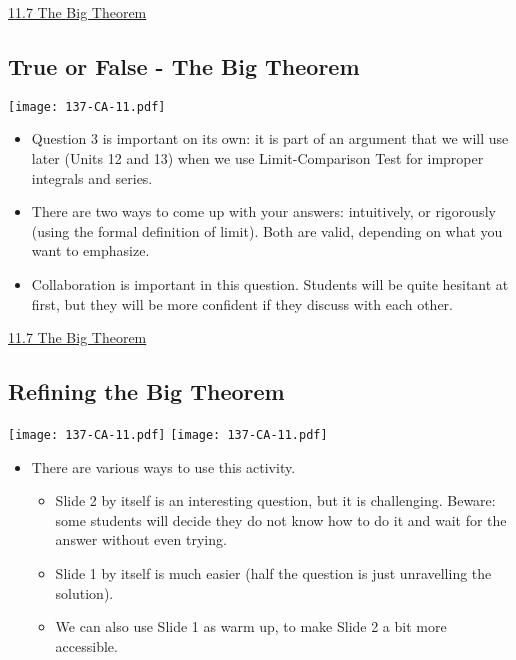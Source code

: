 \documentclass[11pt]{article}
\newcommand{\nl}{\hfill \vspace{-1.1\baselineskip}} %
\newcommand{\vvii}{\hspace{8mm} \href{https://www.youtube.com/watch?v=Dd3n2rfqxf4&list=PLlwePzQY_wW_yFyXauToZNFNhhufzioP2&index=7}{11.7 The Big Theorem}}
\begin{document}
\begin{videos}
\vvii
\end{videos}

\newpage
\subsection{True or False - The Big Theorem}

\begin{center}
{ \texttt{[image: 137-CA-11.pdf]}} 
\end{center}

\begin{comments}
\nl
	\begin{itemize}
		\item Question 3 is important on its own: it is part of an argument that we will use later (Units 12 and 13) when we use Limit-Comparison Test for improper integrals and series.
		\item  There are two ways to come up with your answers: intuitively, or rigorously (using the formal definition of limit).  Both are valid, depending on what you want to emphasize.
		\item Collaboration is important in this question.  Students will be quite hesitant at first, but they will be more confident if they discuss with each other.
	\end{itemize}
\end{comments}

\begin{videos}
\vvii
\end{videos}

\newpage
\subsection{Refining the Big Theorem}

\begin{center}
{ \texttt{[image: 137-CA-11.pdf]}} \quad
{ \texttt{[image: 137-CA-11.pdf]}} 
\end{center}

\begin{comments}
\nl
	\begin{itemize}
		\item   There are various ways to use this activity.
			\begin{itemize}
				\item Slide 2 by itself is an interesting question, but it is challenging.  Beware: some students will decide they do not know how to do it and wait for the answer without even trying.
				\item  Slide 1 by itself is much easier (half the question is just unravelling the solution).
				\item  We can also use Slide 1 as warm up, to make Slide 2 a bit more accessible.
			\end{itemize}
	\end{itemize}
\end{comments}
\end{document}
